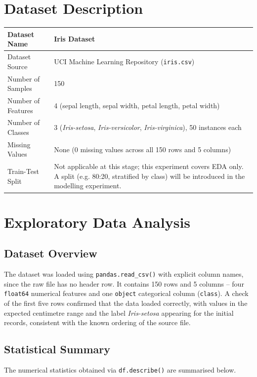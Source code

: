 \documentclass[12pt,a4paper]{article}
\begin{document}
\section{Dataset Description}
\begin{longtable}{|p{6cm}|p{8cm}|}
\hline
Dataset Name & Iris Dataset \\ \hline
Dataset Source & UCI Machine Learning Repository (\texttt{iris.csv}) \\ \hline
Number of Samples & 150 \\ \hline
Number of Features & 4 (sepal length, sepal width, petal length, petal width) \\ \hline
Number of Classes & 3 (\textit{Iris-setosa}, \textit{Iris-versicolor}, \textit{Iris-virginica}), 50 instances each \\ \hline
Missing Values & None (0 missing values across all 150 rows and 5 columns) \\ \hline
Train-Test Split & Not applicable at this stage; this experiment covers EDA only. A split (e.g. 80:20, stratified by class) will be introduced in the modelling experiment. \\ \hline
\end{longtable}

\section{Exploratory Data Analysis}

\subsection*{Dataset Overview}
The dataset was loaded using \texttt{pandas.read\_csv()} with explicit column names, since the raw file has no header row. It contains 150 rows and 5 columns -- four \texttt{float64} numerical features and one \texttt{object} categorical column (\texttt{class}). A check of the first five rows confirmed that the data loaded correctly, with values in the expected centimetre range and the label \textit{Iris-setosa} appearing for the initial records, consistent with the known ordering of the source file.

\subsection*{Statistical Summary}
The numerical statistics obtained via \texttt{df.describe()} are summarised below.
\end{document}
